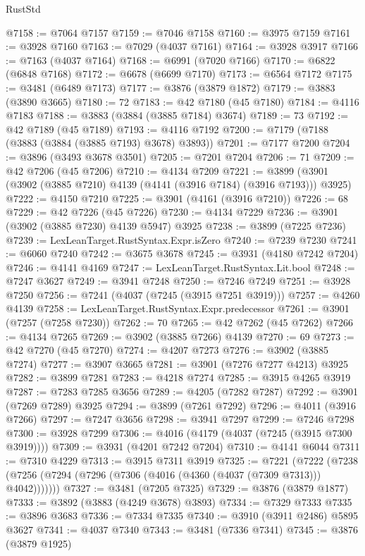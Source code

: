 \begin{lexlean}{RustStd}
\begin{coremodule}
@7158 := @7064 @7157
@7159 := @7046 @7158
@7160 := @3975 @7159
@7161 := @3928 @7160
@7163 := @7029 (@4037 @7161)
@7164 := @3928 @3917
@7166 := @7163 (@4037 @7164)
@7168 := @6991 (@7020 @7166)
@7170 := @6822 (@6848 @7168)
@7172 := @6678 (@6699 @7170)
@7173 := @6564 @7172
@7175 := @3481 (@6489 @7173)
@7177 := @3876 (@3879 @1872)
@7179 := @3883 (@3890 @3665)
@7180 := 72
@7183 := @42 @7180 (@45 @7180)
@7184 := @4116 @7183
@7188 := @3883 (@3884 (@3885 @7184) @3674)
@7189 := 73
@7192 := @42 @7189 (@45 @7189)
@7193 := @4116 @7192
@7200 := @7179 (@7188 (@3883 (@3884 (@3885 @7193) @3678) @3893))
@7201 := @7177 @7200
@7204 := @3896 (@3493 @3678 @3501)
@7205 := @7201 @7204
@7206 := 71
@7209 := @42 @7206 (@45 @7206)
@7210 := @4134 @7209
@7221 := @3899 (@3901 (@3902 (@3885 @7210) @4139 (@4141 (@3916 @7184) (@3916 @7193))) @3925)
@7222 := @4150 @7210
@7225 := @3901 (@4161 (@3916 @7210))
@7226 := 68
@7229 := @42 @7226 (@45 @7226)
@7230 := @4134 @7229
@7236 := @3901 (@3902 (@3885 @7230) @4139 @5947) @3925
@7238 := @3899 (@7225 @7236)
@7239 := LexLeanTarget.RustSyntax.Expr.isZero
@7240 := @7239 @7230
@7241 := @6060 @7240
@7242 := @3675 @3678
@7245 := @3931 (@4180 @7242 @7204)
@7246 := @4141 @4169
@7247 := LexLeanTarget.RustSyntax.Lit.bool
@7248 := @7247 @3627
@7249 := @3941 @7248
@7250 := @7246 @7249
@7251 := @3928 @7250
@7256 := @7241 (@4037 (@7245 (@3915 @7251 @3919)))
@7257 := @4260 @4139
@7258 := LexLeanTarget.RustSyntax.Expr.predecessor
@7261 := @3901 (@7257 (@7258 @7230))
@7262 := 70
@7265 := @42 @7262 (@45 @7262)
@7266 := @4134 @7265
@7269 := @3902 (@3885 @7266) @4139
@7270 := 69
@7273 := @42 @7270 (@45 @7270)
@7274 := @4207 @7273
@7276 := @3902 (@3885 @7274)
@7277 := @3907 @3665
@7281 := @3901 (@7276 @7277 @4213) @3925
@7282 := @3899 @7281
@7283 := @4218 @7274
@7285 := @3915 @4265 @3919
@7287 := @7283 @7285 @3656
@7289 := @4205 (@7282 @7287)
@7292 := @3901 (@7269 @7289) @3925
@7294 := @3899 (@7261 @7292)
@7296 := @4011 (@3916 @7266)
@7297 := @7247 @3656
@7298 := @3941 @7297
@7299 := @7246 @7298
@7300 := @3928 @7299
@7306 := @4016 (@4179 (@4037 (@7245 (@3915 @7300 @3919))))
@7309 := @3931 (@4201 @7242 @7204)
@7310 := @4141 @6044
@7311 := @7310 @4229
@7313 := @3915 @7311 @3919
@7325 := @7221
    (@7222 (@7238 (@7256 (@7294 (@7296 (@7306 (@4016 (@4360 (@4037 (@7309 @7313))) @4042)))))))
@7327 := @3481 (@7205 @7325)
@7329 := @3876 (@3879 @1877)
@7333 := @3892 (@3883 (@4249 @3678) @3893)
@7334 := @7329 @7333
@7335 := @3896 @3683
@7336 := @7334 @7335
@7340 := @3910 (@3911 @2486) @5895 @3627
@7341 := @4037 @7340
@7343 := @3481 (@7336 @7341)
@7345 := @3876 (@3879 @1925)

\end{coremodule}
\end{lexlean}

